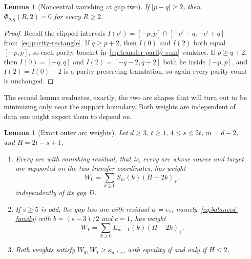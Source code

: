 \documentclass[pdflatex,sn-mathphys-num]{sn-jnl}
\theoremstyle{thmstyleone}
\newtheorem{lemma}[theorem]{Lemma}
\theoremstyle{thmstylethree}
\theoremstyle{thmstyletwo}
\begin{document}
\begin{lemma}[Noncentral vanishing at gap two]
\label{lem:gap-two-vanishing}
If $|p-q|\ge2$, then $\Phi_{p,q}(R,2)=0$ for every $R\ge2$.
\end{lemma}

\begin{proof}
Recall the clipped intervals
$I(c')=[-p,p]\cap[-c'-q,-c'+q]$ from~\eqref{eq:parity-rectangle}.  If
$q\ge p+2$, then $I(0)$ and $I(2)$ both equal $[-p,p]$, so each parity
bracket in~\eqref{eq:transfer-parity-sum} vanishes.  If $p\ge q+2$, then
$I(0)=[-q,q]$ and $I(2)=[-q-2,q-2]$ both lie inside $[-p,p]$, and
$I(2)=I(0)-2$ is a parity-preserving translation, so again every parity
count is unchanged.
\end{proof}

The second lemma evaluates, exactly, the two arc shapes that will turn out
to be minimizing only near the support boundary.  Both weights are
independent of data one might expect them to depend on.

\begin{lemma}[Exact outer arc weights]
\label{lem:outer-weights}
Let $d\ge3$, $t\ge1$, $4\le s\le2t$, $m=d-2$, and $H=2t-s+1$.
\begin{enumerate}
\item[\textup{(i)}] Every arc with vanishing residual, that is, every arc
whose source and target are supported on the two transfer coordinates, has
weight
\[
 W_0=\sum_{k\ge0}S_m(k)(H-2k)_+,
\]
independently of its gap $D$.
\item[\textup{(ii)}] If $s\ge5$ is odd, the gap-two arc with residual
$w=e_1$, namely~\eqref{eq:balanced-family} with $b=(s-3)/2$ and $c=1$, has
weight
\[
 W_1=\sum_{k\ge0}L_{m-1}(k)(H-2k)_+.
\]
\item[\textup{(iii)}] Both weights satisfy
$W_0,W_1\ge\kappa_{d,t,s}$, with equality if and only if $H\le2$.
\end{enumerate}
\end{lemma}
\end{document}
